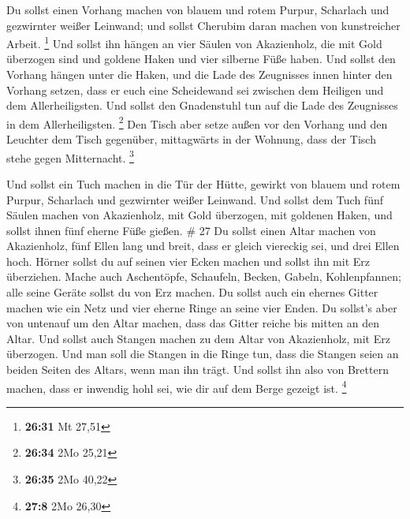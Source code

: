  Du sollst einen Vorhang machen von blauem und rotem
Purpur, Scharlach und gezwirnter weißer Leinwand; und sollst Cherubim
daran machen von kunstreicher Arbeit. \footnote{\textbf{26:31} Mt 27,51}
 Und sollst ihn hängen an vier Säulen von Akazienholz,
die mit Gold überzogen sind und goldene Haken und vier silberne Füße
haben.  Und sollst den Vorhang hängen unter die Haken,
und die Lade des Zeugnisses innen hinter den Vorhang setzen, dass er
euch eine Scheidewand sei zwischen dem Heiligen und dem Allerheiligsten.
 Und sollst den Gnadenstuhl tun auf die Lade des
Zeugnisses in dem Allerheiligsten. \footnote{\textbf{26:34} 2Mo 25,21}
 Den Tisch aber setze außen vor den Vorhang und den
Leuchter dem Tisch gegenüber, mittagwärts in der Wohnung, dass der Tisch
stehe gegen Mitternacht. \footnote{\textbf{26:35} 2Mo 40,22}

 Und sollst ein Tuch machen in die Tür der Hütte, gewirkt
von blauem und rotem Purpur, Scharlach und gezwirnter weißer Leinwand.
 Und sollst dem Tuch fünf Säulen machen von Akazienholz,
mit Gold überzogen, mit goldenen Haken, und sollst ihnen fünf eherne
Füße gießen. \# 27  Du sollst einen Altar machen von
Akazienholz, fünf Ellen lang und breit, dass er gleich viereckig sei,
und drei Ellen hoch.  Hörner sollst du auf seinen vier
Ecken machen und sollst ihn mit Erz überziehen.  Mache
auch Aschentöpfe, Schaufeln, Becken, Gabeln, Kohlenpfannen; alle seine
Geräte sollst du von Erz machen.  Du sollst auch ein
ehernes Gitter machen wie ein Netz und vier eherne Ringe an seine vier
Enden.  Du sollst's aber von untenauf um den Altar machen,
dass das Gitter reiche bis mitten an den Altar.  Und
sollst auch Stangen machen zu dem Altar von Akazienholz, mit Erz
überzogen.  Und man soll die Stangen in die Ringe tun,
dass die Stangen seien an beiden Seiten des Altars, wenn man ihn trägt.
 Und sollst ihn also von Brettern machen, dass er inwendig
hohl sei, wie dir auf dem Berge gezeigt ist. \footnote{\textbf{27:8} 2Mo
  26,30}

